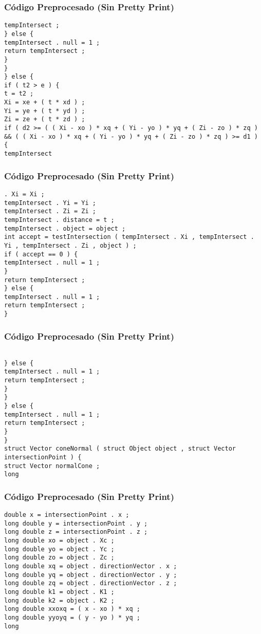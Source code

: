 \documentclass{beamer}
\begin{document}
\begin{frame}[fragile]
\frametitle{C\'odigo Preprocesado (Sin Pretty Print)}
\begin{lstlisting}[style=CStyle]
tempIntersect ; 
} else { 
tempIntersect . null = 1 ; 
return tempIntersect ; 
} 
} 
} else { 
if ( t2 > e ) { 
t = t2 ; 
Xi = xe + ( t * xd ) ; 
Yi = ye + ( t * yd ) ; 
Zi = ze + ( t * zd ) ; 
if ( d2 >= ( ( Xi - xo ) * xq + ( Yi - yo ) * yq + ( Zi - zo ) * zq ) && ( ( Xi - xo ) * xq + ( Yi - yo ) * yq + ( Zi - zo ) * zq ) >= d1 ) { 
tempIntersect \end{lstlisting}
\end{frame}
\begin{frame}[fragile]
\frametitle{C\'odigo Preprocesado (Sin Pretty Print)}
\begin{lstlisting}[style=CStyle]
. Xi = Xi ; 
tempIntersect . Yi = Yi ; 
tempIntersect . Zi = Zi ; 
tempIntersect . distance = t ; 
tempIntersect . object = object ; 
int accept = testIntersection ( tempIntersect . Xi , tempIntersect . Yi , tempIntersect . Zi , object ) ; 
if ( accept == 0 ) { 
tempIntersect . null = 1 ; 
} 
return tempIntersect ; 
} else { 
tempIntersect . null = 1 ; 
return tempIntersect ; 
} \end{lstlisting}
\end{frame}
\begin{frame}[fragile]
\frametitle{C\'odigo Preprocesado (Sin Pretty Print)}
\begin{lstlisting}[style=CStyle]

} else { 
tempIntersect . null = 1 ; 
return tempIntersect ; 
} 
} 
} else { 
tempIntersect . null = 1 ; 
return tempIntersect ; 
} 
} 
struct Vector coneNormal ( struct Object object , struct Vector intersectionPoint ) { 
struct Vector normalCone ; 
long \end{lstlisting}
\end{frame}
\begin{frame}[fragile]
\frametitle{C\'odigo Preprocesado (Sin Pretty Print)}
\begin{lstlisting}[style=CStyle]
double x = intersectionPoint . x ; 
long double y = intersectionPoint . y ; 
long double z = intersectionPoint . z ; 
long double xo = object . Xc ; 
long double yo = object . Yc ; 
long double zo = object . Zc ; 
long double xq = object . directionVector . x ; 
long double yq = object . directionVector . y ; 
long double zq = object . directionVector . z ; 
long double k1 = object . K1 ; 
long double k2 = object . K2 ; 
long double xxoxq = ( x - xo ) * xq ; 
long double yyoyq = ( y - yo ) * yq ; 
long \end{lstlisting}
\end{frame}
\end{document}
